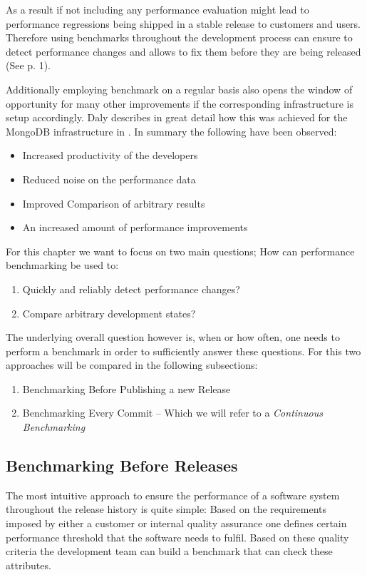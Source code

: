 \documentclass[	runningheads,
				a4paper]{llncs}
\begin{document}
	As a result if not including any performance evaluation might lead to performance regressions being shipped in a stable release to customers and users. Therefore using benchmarks throughout the development process can ensure to detect performance changes and allows to fix them before they are being released (See \cite{daly2021} p. 1). 

	Additionally employing benchmark on a regular basis also opens the window of opportunity for many other improvements if the corresponding infrastructure is setup accordingly. Daly describes in great detail how this was achieved for the MongoDB infrastructure in \cite{daly2021}. In summary the following have been observed:
	\begin{itemize}
		\item Increased productivity of the developers
		\item Reduced noise on the performance data
		\item Improved Comparison of arbitrary results
		\item An increased amount of performance improvements
	\end{itemize}

	For this chapter we want to focus on two main questions; How can performance benchmarking be used to:
	\begin{enumerate}
		\item Quickly and reliably detect performance changes?
		\item Compare arbitrary development states?
	\end{enumerate}

	The underlying overall question however is, when or how often, one needs to perform a benchmark in order to sufficiently answer these questions. For this two approaches will be compared in the following subsections:
	\begin{enumerate}
		\item Benchmarking Before Publishing a new Release
		\item Benchmarking Every Commit -- Which we will refer to a \textit{Continuous Benchmarking}
	\end{enumerate}

	\subsection{Benchmarking Before Releases}
	The most intuitive approach to ensure the performance of a software system throughout the release history is quite simple: Based on the requirements imposed by either a customer or internal quality assurance one defines certain performance threshold that the software needs to fulfil. Based on these quality criteria the development team can build a benchmark that can check these attributes.
\end{document}
